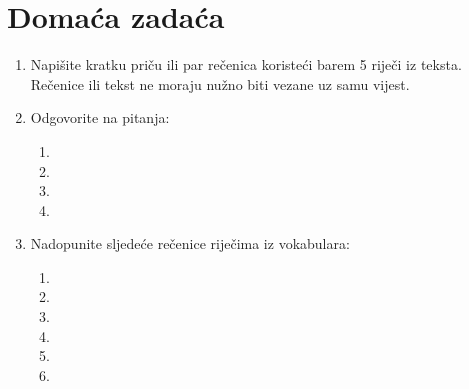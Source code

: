 \documentclass[a5paper, 10pt]{tekst}
\begin{document}
	\section*{Domaća zadaća}
	\begin{enumerate}
		\item Napišite kratku priču ili par rečenica koristeći barem 5 riječi iz teksta. Rečenice ili tekst ne moraju nužno biti vezane uz samu vijest. 
		\item Odgovorite na pitanja:
		\begin{enumerate}[label=(\roman*)]
			\item {}
			\item {}
			\item {}
			\item {}
		\end{enumerate}
		
		\item Nadopunite sljedeće rečenice riječima iz vokabulara:
		\begin{enumerate}[label=(\roman*)]
			\item {}
			\item {}
			\item {}
			\item {}\p{\ansline{}}
			\item {}
			\item {}\p{\ansline{}}\p{\ansline{}}
		\end{enumerate}
	\end{enumerate}
\end{document}
